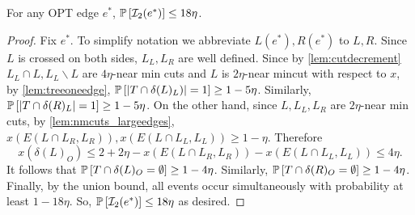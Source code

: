 \begin{lemma}\label{lem:OPT-edge-increase-prob-xed-both-sides}
For any OPT edge $e^*$, $\P{\cI_2(e^*)}\leq 18\eta$.
\end{lemma}
\begin{proof}	Fix $e^*$.
To simplify notation we abbreviate $L(e^*),R(e^*)$ to $L,R$.
Since $L$ is crossed on both sides, $L_L, L_R$ are well defined. Since by \cref{lem:cutdecrement} $L_L\cap L, L_L\smallsetminus L$ are $4\eta$-near min cuts and $L$ is $2\eta$-near mincut with respect to $x$, by \cref{lem:treeoneedge}, $\P{|T\cap \delta(L)_L)|=1}\geq 1-5\eta$. Similarly, $\P{|T\cap \delta(R)_L| = 1}\geq 1-5\eta$. %
On the other hand, since $L, L_L, L_R$ are $2\eta$-near min cuts, by \cref{lem:nmcuts_largeedges}, $x(E(L \cap L_R, L_R)), x(E(L \cap L_L, L_L)) \ge 1-\eta$. Therefore 
$$x(\delta(L)_O) \le 2+2\eta - x(E(L \cap L_R, L_R)) - x(E(L \cap L_L, L_L)) \le 4\eta.$$ 
It follows that $\P{T\cap \delta(L)_O = \emptyset}\geq  1-4\eta$. Similarly, $\P{T\cap \delta(R)_O = \emptyset}\geq  1-4\eta$.
	Finally,	by the union bound, all events occur simultaneously with probability at least $1-18\eta$. So, $\P{\cI_2(e^*)}\leq 18\eta$ as desired.
%	
	\end{proof}


